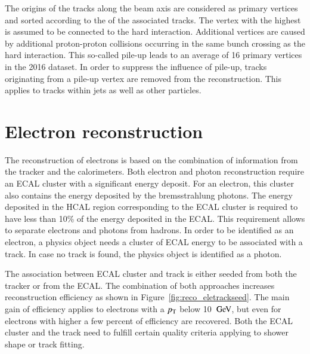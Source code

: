 The origins of the tracks along the beam axis are considered as primary vertices and sorted according to the \pt of the associated tracks.
The vertex with the highest \pt is assumed to be connected to the hard interaction. 
Additional vertices are caused by additional proton-proton collisions occurring in the same bunch crossing as the hard interaction.
This so-called pile-up leads to an average of 16 primary vertices in the 2016 dataset. In order to suppress the influence of pile-up, tracks originating from
a pile-up vertex are removed from the reconstruction. This applies to tracks within jets as well as other particles.

\section{Electron reconstruction}
\label{sec:SimReco_Ele}


The reconstruction of electrons is based on the combination of information from the tracker and the calorimeters.
Both electron and photon reconstruction require an ECAL cluster with a significant energy deposit.
For an electron, this cluster also contains the energy deposited by the bremsstrahlung photons.
The energy deposited in the HCAL region corresponding to the ECAL cluster is required to have less than 10\% of the energy deposited in the ECAL.
This requirement allows to separate electrons and photons from hadrons.
In order to be identified as an electron, a physics object needs a cluster of ECAL energy to be associated with a track.
In case no track is found, the physics object is identified as a photon.

The association between ECAL cluster and track is either seeded from both the tracker or from the ECAL.
The combination of both approaches increases reconstruction efficiency as shown in Figure~\ref{fig:reco_eletrackseed}.
The main gain of efficiency applies to electrons with a $p_{\mathrm{T}}$ below 10 $\,\text{Ge\hspace{-.08em}V}$, but even for electrons with higher \pt a few percent of efficiency are recovered.
Both the ECAL cluster and the track need to fulfill certain quality criteria applying to shower shape or track fitting.

